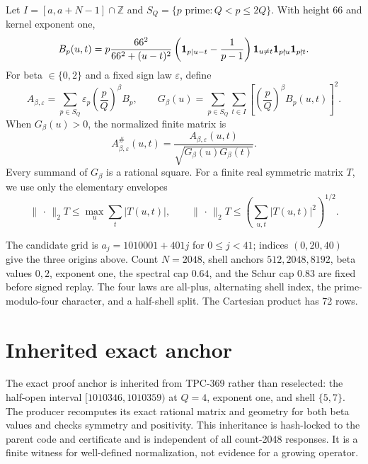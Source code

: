 \documentclass[10pt]{article}
\newcommand{\opnorm}{\lVert\,\cdot\,\rVert_2}
\begin{document}
Let $I=[a,a+N-1]\cap\mathbb Z$ and
$S_Q=\{p\text{ prime}:Q<p\le 2Q\}$.  With height 66 and kernel exponent one,
\begin{equation}
B_p(u,t)=p\frac{66^2}{66^2+(u-t)^2}
 \left({\bf1}_{p\mid u-t}-\frac1{p-1}\right)
 \mathbf 1_{u\ne t}\mathbf 1_{p\nmid u}\mathbf 1_{p\nmid t}.
\label{eq:block}
\end{equation}
For beta $\in\{0,2\}$ and a fixed sign law $\varepsilon$, define
\begin{equation}
A_{\beta,\varepsilon}=\sum_{p\in S_Q}\varepsilon_p
 \left(\frac pQ\right)^\beta B_p,
\qquad
G_\beta(u)=\sum_{p\in S_Q}\sum_{t\in I}
 \left[\left(\frac pQ\right)^\beta B_p(u,t)\right]^2.
\label{eq:weighted}
\end{equation}
When $G_\beta(u)>0$, the normalized finite matrix is
\begin{equation}
A_{\beta,\varepsilon}^{\#}(u,t)=
\frac{A_{\beta,\varepsilon}(u,t)}
 {\sqrt{G_\beta(u)G_\beta(t)}}.
\label{eq:norm}
\end{equation}
Every summand of $G_\beta$ is a rational square.  For a finite real symmetric
matrix $T$, we use only the elementary envelopes
\begin{equation}
\opnorm{T}\leq\max_u\sum_t|T(u,t)|,
\qquad
\opnorm{T}\leq\left(\sum_{u,t}|T(u,t)|^2\right)^{1/2}.
\label{eq:envelopes}
\end{equation}

The candidate grid is $a_j=1010001+401j$ for $0\le j<41$; indices
$(0,20,40)$ give the three origins above.  Count $N=2048$, shell anchors
$512,2048,8192$, beta values $0,2$, exponent one, the spectral cap $0.64$,
and the Schur cap $0.83$ are fixed before signed replay.  The four laws are
all-plus, alternating shell index, the prime-modulo-four character, and a
half-shell split.  The Cartesian product has 72 rows.

\section{Inherited exact anchor}

The exact proof anchor is inherited from TPC-369 rather than reselected:
the half-open interval $[1010346,1010359)$ at $Q=4$, exponent one, and shell
$\{5,7\}$.  The producer recomputes its exact rational matrix and geometry
for both beta values and checks symmetry and positivity.  This inheritance is
hash-locked to the parent code and certificate and is independent of all
count-2048 responses.  It is a finite witness for well-defined normalization,
not evidence for a growing operator.
\end{document}
